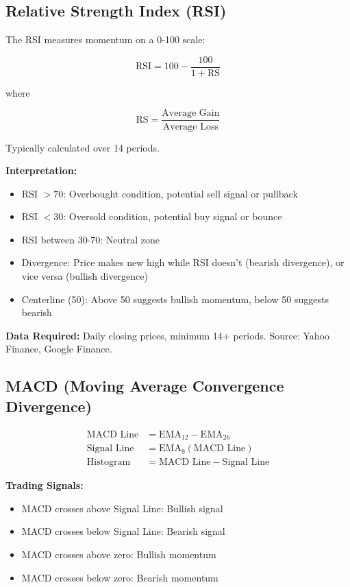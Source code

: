 \documentclass[11pt,a4paper]{article}
\begin{document}
\subsection{Relative Strength Index (RSI)}

The RSI measures momentum on a 0-100 scale:

\begin{equation}
\text{RSI} = 100 - \frac{100}{1 + \text{RS}}
\end{equation}

where

\begin{equation}
\text{RS} = \frac{\text{Average Gain}}{\text{Average Loss}}
\end{equation}

Typically calculated over 14 periods. 

\textbf{Interpretation:}
\begin{itemize}
    \item RSI $> 70$: Overbought condition, potential sell signal or pullback
    \item RSI $< 30$: Oversold condition, potential buy signal or bounce
    \item RSI between 30-70: Neutral zone
    \item Divergence: Price makes new high while RSI doesn't (bearish divergence), or vice versa (bullish divergence)
    \item Centerline (50): Above 50 suggests bullish momentum, below 50 suggests bearish
\end{itemize}

\textbf{Data Required:} Daily closing prices, minimum 14+ periods. Source: Yahoo Finance, Google Finance.

\subsection{MACD (Moving Average Convergence Divergence)}

\begin{align}
\text{MACD Line} &= \text{EMA}_{12} - \text{EMA}_{26}\\
\text{Signal Line} &= \text{EMA}_9(\text{MACD Line})\\
\text{Histogram} &= \text{MACD Line} - \text{Signal Line}
\end{align}

\textbf{Trading Signals:}
\begin{itemize}
    \item MACD crosses above Signal Line: Bullish signal
    \item MACD crosses below Signal Line: Bearish signal
    \item MACD crosses above zero: Bullish momentum
    \item MACD crosses below zero: Bearish momentum
\end{itemize}
\end{document}
